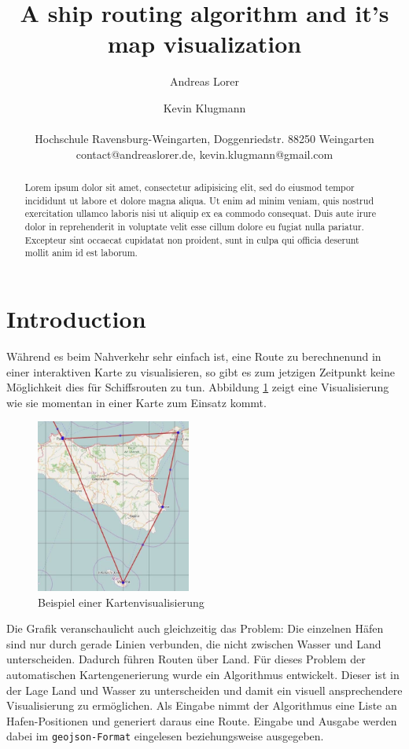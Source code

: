 \documentclass[letterpaper]{article}
\title{A ship routing algorithm and it's map visualization}
\author{Andreas Lorer \and  Kevin Klugmann\\
\mbox{}\\
Hochschule Ravensburg-Weingarten, Doggenriedstr. 88250 Weingarten \\
contact@andreaslorer.de, kevin.klugmann@gmail.com}
\begin{document}
\maketitle

\begin{abstract}
Lorem ipsum dolor sit amet, consectetur adipisicing elit, sed do eiusmod
tempor incididunt ut labore et dolore magna aliqua. Ut enim ad minim veniam,
quis nostrud exercitation ullamco laboris nisi ut aliquip ex ea commodo
consequat. Duis aute irure dolor in reprehenderit in voluptate velit esse
cillum dolore eu fugiat nulla pariatur. Excepteur sint occaecat cupidatat non
proident, sunt in culpa qui officia deserunt mollit anim id est laborum.
\end{abstract}

\section{Introduction}
	Während es beim Nahverkehr sehr einfach ist, eine Route zu berechnen\footnotemark und in einer interaktiven Karte zu visualisieren, so gibt es zum jetzigen Zeitpunkt keine Möglichkeit dies für Schiffsrouten zu tun. Abbildung \ref{fig:visualisierungsproblem} zeigt eine Visualisierung wie sie momentan in einer Karte zum Einsatz kommt. 


	\begin{figure}[!htb]
		\begin{center}
		\includegraphics[width=2in]{visualisierungsproblem}
		\caption{Beispiel einer Kartenvisualisierung}
		\label{fig:visualisierungsproblem}
		\end{center}
	\end{figure}

	Die Grafik veranschaulicht auch gleichzeitig das Problem: Die einzelnen Häfen sind nur durch gerade Linien verbunden, die nicht zwischen Wasser und Land unterscheiden. Dadurch führen Routen über Land. Für dieses Problem der automatischen Kartengenerierung wurde ein Algorithmus entwickelt. Dieser ist in der Lage Land und Wasser zu unterscheiden und damit ein visuell ansprechendere Visualisierung zu ermöglichen. Als Eingabe nimmt der Algorithmus eine Liste an Hafen-Positionen und generiert daraus eine Route. Eingabe und Ausgabe werden dabei im \texttt{geojson-Format} \cite{rfc7946} eingelesen beziehungsweise ausgegeben.
\end{document}
